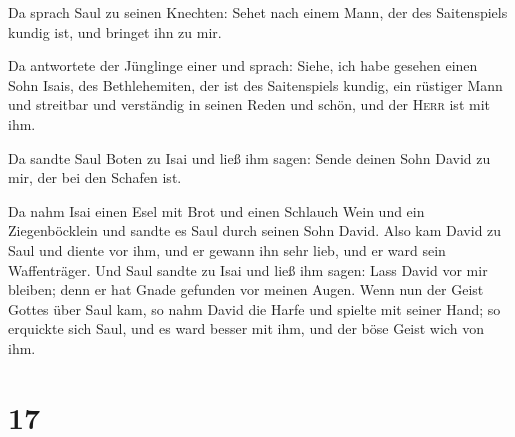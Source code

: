  Da sprach Saul zu seinen Knechten: Sehet nach einem
Mann, der des Saitenspiels kundig ist, und bringet ihn zu mir.

 Da antwortete der Jünglinge einer und sprach: Siehe, ich
habe gesehen einen Sohn Isais, des Bethlehemiten, der ist des
Saitenspiels kundig, ein rüstiger Mann und streitbar und verständig in
seinen Reden und schön, und der \textsc{Herr} ist mit ihm.

 Da sandte Saul Boten zu Isai und ließ ihm sagen: Sende
deinen Sohn David zu mir, der bei den Schafen ist.

 Da nahm Isai einen Esel mit Brot und einen Schlauch Wein
und ein Ziegenböcklein und sandte es Saul durch seinen Sohn David.
 Also kam David zu Saul und diente vor ihm, und er gewann
ihn sehr lieb, und er ward sein Waffenträger.  Und Saul
sandte zu Isai und ließ ihm sagen: Lass David vor mir bleiben; denn er
hat Gnade gefunden vor meinen Augen.  Wenn nun der Geist
Gottes über Saul kam, so nahm David die Harfe und spielte mit seiner
Hand; so erquickte sich Saul, und es ward besser mit ihm, und der böse
Geist wich von ihm.

\hypertarget{section-16}{%
\section{17}\label{section-16}}

